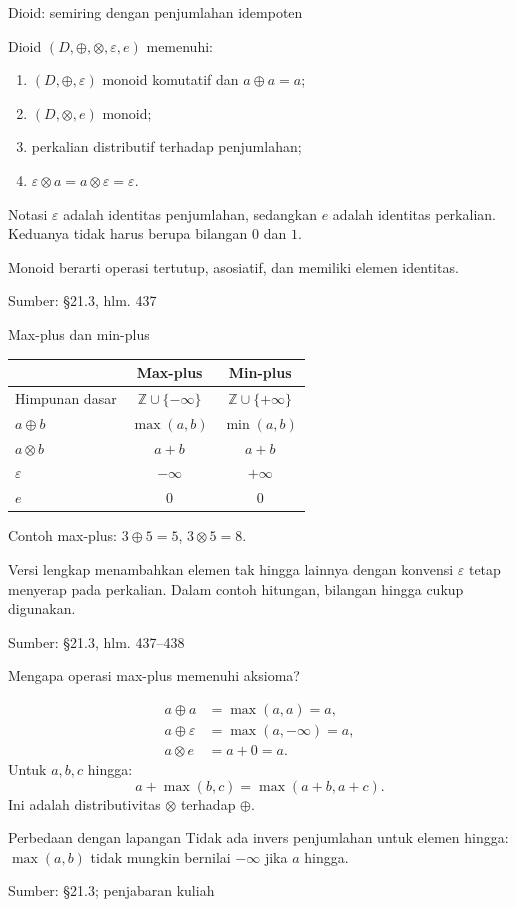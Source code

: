 \documentclass[aspectratio=169,11pt]{beamer}
\newcommand{\source}[1]{%
    \vfill
    \hfill{\tiny\color{gray}Sumber: #1}
}
\newcommand{\eps}{\varepsilon}
\begin{document}
\begin{frame}{Dioid: semiring dengan penjumlahan idempoten}


Dioid $(D,\oplus,\otimes,\eps,e)$ memenuhi:
\begin{enumerate}
\item $(D,\oplus,\eps)$ monoid komutatif dan $a\oplus a=a$;
\item $(D,\otimes,e)$ monoid;
\item perkalian distributif terhadap penjumlahan;
\item $\eps\otimes a=a\otimes\eps=\eps$.
\end{enumerate}
\begin{block}{Notasi}
$\eps$ adalah identitas penjumlahan, sedangkan $e$ adalah identitas perkalian.
Keduanya tidak harus berupa bilangan $0$ dan $1$.
\end{block}
Monoid berarti operasi tertutup, asosiatif, dan memiliki elemen identitas.

\source{\S21.3, hlm. 437}

\end{frame}
\begin{frame}{Max-plus dan min-plus}


\begin{center}\begin{tabular}{lcc}\toprule
&Max-plus&Min-plus\\\midrule
Himpunan dasar&$\mathbb Z\cup\{-\infty\}$&$\mathbb Z\cup\{+\infty\}$\\
$a\oplus b$&$\max(a,b)$&$\min(a,b)$\\
$a\otimes b$&$a+b$&$a+b$\\
$\eps$&$-\infty$&$+\infty$\\
$e$&$0$&$0$\\\bottomrule
\end{tabular}\end{center}
Contoh max-plus: $3\oplus5=5$, $3\otimes5=8$.
\medskip

Versi lengkap menambahkan elemen tak hingga lainnya dengan konvensi
$\eps$ tetap menyerap pada perkalian.
Dalam contoh hitungan, bilangan hingga cukup digunakan.

\source{\S21.3, hlm. 437--438}

\end{frame}
\begin{frame}{Mengapa operasi max-plus memenuhi aksioma?}


\begin{align*}
a\oplus a&=\max(a,a)=a,\\
a\oplus\eps&=\max(a,-\infty)=a,\\
a\otimes e&=a+0=a.
\end{align*}
Untuk $a,b,c$ hingga:
\[
a+\max(b,c)=\max(a+b,a+c).
\]
Ini adalah distributivitas $\otimes$ terhadap $\oplus$.
\begin{block}{Perbedaan dengan lapangan}
Tidak ada invers penjumlahan untuk elemen hingga:
$\max(a,b)$ tidak mungkin bernilai $-\infty$ jika $a$ hingga.
\end{block}

\source{\S21.3; penjabaran kuliah}

\end{frame}
\end{document}
